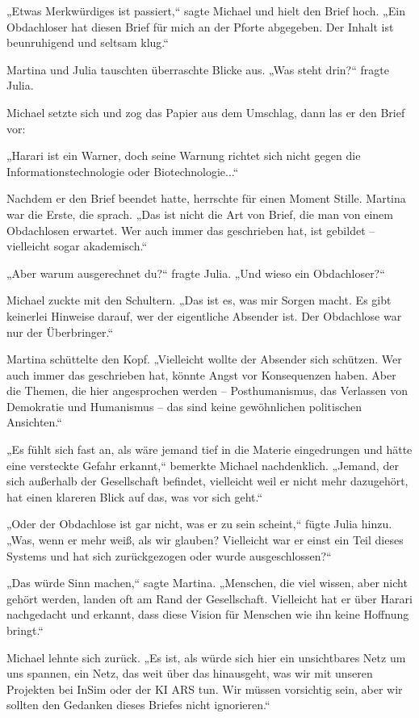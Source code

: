 \documentclass[
]{article}
\begin{document}
„Etwas Merkwürdiges ist passiert,`` sagte Michael und hielt den Brief
hoch. „Ein Obdachloser hat diesen Brief für mich an der Pforte
abgegeben. Der Inhalt ist beunruhigend und seltsam klug.``

Martina und Julia tauschten überraschte Blicke aus. „Was steht
drin?{\kern0pt}`` fragte Julia.

Michael setzte sich und zog das Papier aus dem Umschlag, dann las er den
Brief vor:

„Harari ist ein Warner, doch seine Warnung richtet sich nicht gegen die
Informationstechnologie oder Biotechnologie...``

Nachdem er den Brief beendet hatte, herrschte für einen Moment Stille.
Martina war die Erste, die sprach. „Das ist nicht die Art von Brief, die
man von einem Obdachlosen erwartet. Wer auch immer das geschrieben hat,
ist gebildet -- vielleicht sogar akademisch.``

„Aber warum ausgerechnet du?{\kern0pt}`` fragte Julia. „Und wieso ein
Obdachloser?{\kern0pt}``

Michael zuckte mit den Schultern. „Das ist es, was mir Sorgen macht. Es
gibt keinerlei Hinweise darauf, wer der eigentliche Absender ist. Der
Obdachlose war nur der Überbringer.``

Martina schüttelte den Kopf. „Vielleicht wollte der Absender sich
schützen. Wer auch immer das geschrieben hat, könnte Angst vor
Konsequenzen haben. Aber die Themen, die hier angesprochen werden --
Posthumanismus, das Verlassen von Demokratie und Humanismus -- das sind
keine gewöhnlichen politischen Ansichten.``

„Es fühlt sich fast an, als wäre jemand tief in die Materie eingedrungen
und hätte eine versteckte Gefahr erkannt,`` bemerkte Michael
nachdenklich. „Jemand, der sich außerhalb der Gesellschaft befindet,
vielleicht weil er nicht mehr dazugehört, hat einen klareren Blick auf
das, was vor sich geht.``

„Oder der Obdachlose ist gar nicht, was er zu sein scheint,`` fügte
Julia hinzu. „Was, wenn er mehr weiß, als wir glauben? Vielleicht war er
einst ein Teil dieses Systems und hat sich zurückgezogen oder wurde
ausgeschlossen?{\kern0pt}``

„Das würde Sinn machen,`` sagte Martina. „Menschen, die viel wissen,
aber nicht gehört werden, landen oft am Rand der Gesellschaft.
Vielleicht hat er über Harari nachgedacht und erkannt, dass diese Vision
für Menschen wie ihn keine Hoffnung bringt.``

Michael lehnte sich zurück. „Es ist, als würde sich hier ein
unsichtbares Netz um uns spannen, ein Netz, das weit über das
hinausgeht, was wir mit unseren Projekten bei InSim oder der KI ARS tun.
Wir müssen vorsichtig sein, aber wir sollten den Gedanken dieses Briefes
nicht ignorieren.``
\end{document}
